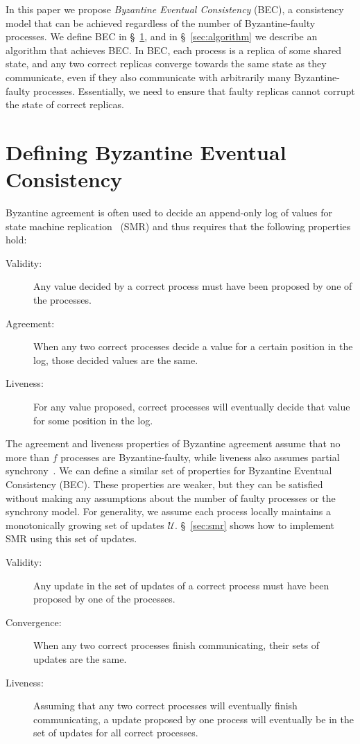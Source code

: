 \documentclass[manuscript,anonymous]{acmart}
\begin{document}
In this paper we propose \emph{Byzantine Eventual Consistency} (BEC), a consistency model that can be achieved regardless of the number of Byzantine-faulty processes.
We define BEC in \S~\ref{sec:properties}, and in \S~\ref{sec:algorithm} we describe an algorithm that achieves BEC.
In BEC, each process is a replica of some shared state, and any two correct replicas converge towards the same state as they communicate, even if they also communicate with arbitrarily many Byzantine-faulty processes.
Essentially, we need to ensure that faulty replicas cannot corrupt the state of correct replicas.

\section{Defining Byzantine Eventual Consistency}\label{sec:properties}

Byzantine agreement is often used to decide an append-only log of values for state machine replication~\cite{Schneider:1990} (SMR) and thus requires that the following properties hold:

\begin{description}
\item[Validity:] Any value decided by a correct process must have been proposed by one of the processes.
\item[Agreement:] When any two correct processes decide a value for a certain position in the log, those decided values are the same.
\item[Liveness:] For any value proposed, correct processes will eventually decide that value for some position in the log.
\end{description}

The agreement and liveness properties of Byzantine agreement assume that no more than $f$ processes are Byzantine-faulty, while liveness also assumes partial synchrony~\cite{Dwork:1988}.
We can define a similar set of properties for Byzantine Eventual Consistency (BEC).
These properties are weaker, but they can be satisfied without making any assumptions about the number of faulty processes or the synchrony model.
For generality, we assume each process locally maintains a monotonically growing set of updates $\mathcal{U}$.
\S~\ref{sec:smr} shows how to implement SMR using this set of updates.

\begin{description}
\item[Validity:] Any update in the set of updates of a correct process must have been proposed by one of the processes.
\item[Convergence:] When any two correct processes finish communicating, their sets of updates are the same.
\item[Liveness:] Assuming that any two correct processes will eventually finish communicating, a update proposed by one process will eventually be in the set of updates for all correct processes.
\end{description}
\end{document}
